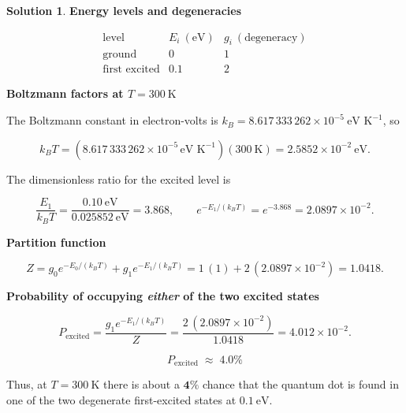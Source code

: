 \documentclass[12pt]{article}
\theoremstyle{definition} %
\newtheorem{solution}{Solution}
\theoremstyle{plain} %
\begin{document}
        \begin{solution}
          \textbf{Energy levels and degeneracies}
          
          \[
          \begin{array}{c|c|c}
          \text{level} & E_i\ (\text{eV}) & g_i\ (\text{degeneracy})\\ \hline
          \text{ground} & 0   & 1 \\
          \text{first excited} & 0.1 & 2
          \end{array}
          \]
          
          \medskip
          \textbf{Boltzmann factors at \(T = 300\ \text{K}\)}
          
          The Boltzmann constant in electron-volts is  
          \(k_B = 8.617\,333\,262\times10^{-5}\ \text{eV K}^{-1}\), so
          
          \[
          k_B T = (8.617\,333\,262\times10^{-5}\,\text{eV K}^{-1})(300\ \text{K})
                = 2.5852\times10^{-2}\ \text{eV}.
          \]
          
          The dimensionless ratio for the excited level is
          
          \[
          \frac{E_1}{k_B T} = \frac{0.10\ \text{eV}}{0.025852\ \text{eV}} = 3.868,
          \qquad
          e^{-E_1/(k_B T)} = e^{-3.868} = 2.0897\times10^{-2}.
          \]
          
          \medskip
          \textbf{Partition function}
          
          \[
          Z = g_0 e^{-E_0/(k_B T)} + g_1 e^{-E_1/(k_B T)}
            = 1\,(1) + 2\,(2.0897\times10^{-2})
            = 1.0418 .
          \]
          
          \medskip
          \textbf{Probability of occupying \emph{either} of the two excited states}
          
          \[
          P_\text{excited}
            = \frac{g_1 e^{-E_1/(k_B T)}}{Z}
            = \frac{2\,(2.0897\times10^{-2})}{1.0418}
            = 4.012\times10^{-2}.
          \]
          
          \[
          \boxed{\,P_\text{excited}\;\approx\;4.0\%\,}
          \]
          
          Thus, at \(T = 300\ \text{K}\) there is about a \(\mathbf{4\%}\) chance that the quantum
          dot is found in one of the two degenerate first-excited states at
          \(0.1\ \text{eV}\).
          \end{solution}
\end{document}
